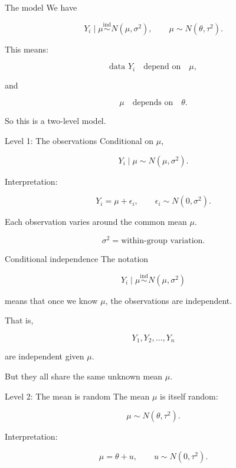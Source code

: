 \documentclass[aspectratio=43,11pt]{beamer}
\begin{document}
{
\begin{frame}{The model}
We have

\[
Y_i \mid \mu \overset{\text{ind}}{\sim} N(\mu,\sigma^2),
\qquad
\mu \sim N(\theta,\tau^2).
\]

\medskip
This means:

\[
\text{data } Y_i
\quad \text{depend on} \quad
\mu,
\]

and

\[
\mu
\quad \text{depends on} \quad
\theta.
\]

\medskip
So this is a two-level model.
\end{frame}

\begin{frame}{Level 1: The observations}
Conditional on \(\mu\),

\[
Y_i \mid \mu \sim N(\mu,\sigma^2).
\]

\medskip
Interpretation:

\[
Y_i = \mu + \epsilon_i,
\qquad
\epsilon_i \sim N(0,\sigma^2).
\]

\medskip
Each observation varies around the common mean \(\mu\).

\[
\sigma^2
=
\text{within-group variation.}
\]
\end{frame}

\begin{frame}{Conditional independence}
The notation

\[
Y_i \mid \mu \overset{\text{ind}}{\sim} N(\mu,\sigma^2)
\]

means that once we know \(\mu\), the observations are independent.

\medskip
That is,

\[
Y_1,Y_2,\ldots,Y_n
\]

are independent given \(\mu\).

\medskip
But they all share the same unknown mean \(\mu\).
\end{frame}

\begin{frame}{Level 2: The mean is random}
The mean \(\mu\) is itself random:

\[
\mu \sim N(\theta,\tau^2).
\]

\medskip
Interpretation:

\[
\mu = \theta + u,
\qquad
u \sim N(0,\tau^2).
\]


\end{frame}}
\end{document}
